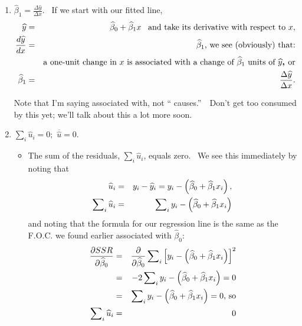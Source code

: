 \documentclass[11pt]{article}
\begin{document}
\begin{itemize}
\begin{enumerate}
\item $\widehat{\beta }_{1}=\frac{\Delta \widehat{y}}{\Delta x}.$ \ If we
start with our fitted line, 
\begin{eqnarray*}
\widehat{y} &=&\widehat{\beta }_{0}+\widehat{\beta }_{1}x\,\ \text{\ and
take its derivative with respect to }x, \\
\frac{d\widehat{y}}{dx} &=&\widehat{\beta }_{1}\text{, we see (obviously)
that:} \\
&&\text{a one-unit change in }x\text{ is associated with a change of }%
\widehat{\beta }_{1}\text{ units of }\widehat{y}\text{\textbf{, }or} \\
\widehat{\beta }_{1} &=&\frac{\Delta \widehat{y}}{\Delta x}.
\end{eqnarray*}

Note that I'm saying associated with, not \textquotedblleft
causes.\textquotedblright\ \ Don't get too consumed by this yet; we'll talk
about this a lot more soon.

\item $\sum\nolimits_{i}\widehat{u}_{i}=0;$ $\overline{\widehat{u}}=0.$

\begin{itemize}
\item The sum of the residuals, $\sum\nolimits_{i}\widehat{u}_{i}$, equals
zero. \ We see this immediately by noting that%
\begin{eqnarray*}
\widehat{u}_{i} &=&y_{i}-\widehat{y}_{i}=y_{i}-\left( \widehat{\beta }_{0}+%
\widehat{\beta }_{1}x_{i}\right) , \\
\sum\nolimits_{i}\widehat{u}_{i} &=&\sum\nolimits_{i}y_{i}-\left( \widehat{%
\beta }_{0}+\widehat{\beta }_{1}x_{i}\right)
\end{eqnarray*}%
and noting that the formula for our regression line is the same as the
F.O.C. we found earlier associated with $\widehat{\beta }_{0}:$ 
\begin{eqnarray*}
\frac{\partial SSR}{\partial \widehat{\beta }_{0}} &=&\frac{\partial }{%
\partial \widehat{\beta }_{0}}\sum\nolimits_{i}\left[ y_{i}-\left( \widehat{%
\beta }_{0}+\widehat{\beta }_{1}x_{i}\right) \right] ^{2} \\
&=&-2\sum\nolimits_{i}y_{i}-\left( \widehat{\beta }_{0}+\widehat{\beta }%
_{1}x_{i}\right) =0 \\
&=&\sum\nolimits_{i}y_{i}-\left( \widehat{\beta }_{0}+\widehat{\beta }%
_{1}x_{i}\right) =0\text{, so} \\
\sum\nolimits_{i}\widehat{u}_{i} &=&0
\end{eqnarray*}


\end{itemize}
\end{enumerate}
\end{itemize}
\end{document}
